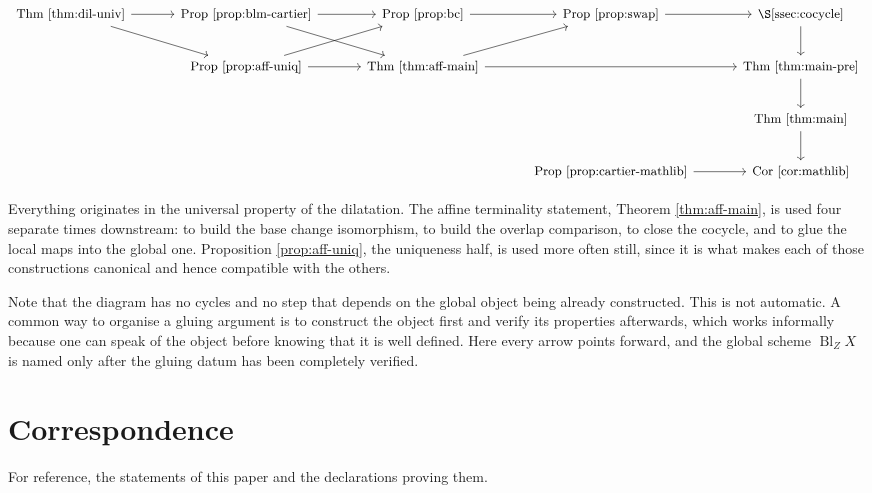 \documentclass[pdflatex,sn-mathphys-num]{sn-jnl}
\theoremstyle{plain}
\theoremstyle{definition}
\newcommand{\Bl}{\operatorname{Bl}}
\begin{document}
\[
\begin{tikzcd}[column sep=1.1cm, row sep=0.75cm]
  \text{\small Thm \ref{thm:dil-univ}}
    \arrow[r] \arrow[dr]
  & \text{\small Prop \ref{prop:blm-cartier}}
    \arrow[r] \arrow[dr]
  & \text{\small Prop \ref{prop:bc}}
    \arrow[r]
  & \text{\small Prop \ref{prop:swap}}
    \arrow[r]
  & \text{\small \S\ref{ssec:cocycle}}
    \arrow[d] \\
  & \text{\small Prop \ref{prop:aff-uniq}}
    \arrow[r] \arrow[ur]
  & \text{\small Thm \ref{thm:aff-main}}
    \arrow[ur] \arrow[rr]
  & & \text{\small Thm \ref{thm:main-pre}}
    \arrow[d] \\
  & & & & \text{\small Thm \ref{thm:main}}
    \arrow[d] \\
  & & & \text{\small Prop \ref{prop:cartier-mathlib}}
    \arrow[r]
  & \text{\small Cor \ref{cor:mathlib}}
\end{tikzcd}
\]

Everything originates in the universal property of the dilatation. The affine
terminality statement, Theorem \ref{thm:aff-main}, is used four separate times
downstream: to build the base change isomorphism, to build the overlap
comparison, to close the cocycle, and to glue the local maps into the global
one. Proposition \ref{prop:aff-uniq}, the uniqueness half, is used more often
still, since it is what makes each of those constructions canonical and hence
compatible with the others.

Note that the diagram has no cycles and no step that depends on the global
object being already constructed. This is not automatic. A common way to
organise a gluing argument is to construct the object first and verify its
properties afterwards, which works informally because one can speak of the
object before knowing that it is well defined. Here every arrow points forward,
and the global scheme $\Bl_Z X$ is named only after the gluing datum has been
completely verified.

\section{Correspondence}\label{ssec:correspondence}

For reference, the statements of this paper and the declarations proving them.
\end{document}

